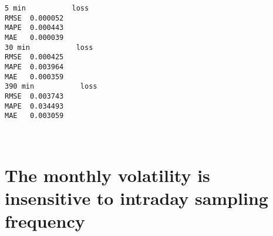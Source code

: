 \documentclass[11pt]{article}
\begin{document}
    \begin{Verbatim}[commandchars=\\\{\}]
5 min           loss
RMSE  0.000052
MAPE  0.000443
MAE   0.000039
30 min           loss
RMSE  0.000425
MAPE  0.003964
MAE   0.000359
390 min           loss
RMSE  0.003743
MAPE  0.034493
MAE   0.003059

    \end{Verbatim}

    \begin{center}
    \end{center}
    { \hspace*{\fill} \\}
    
    \section{The monthly volatility is insensitive to intraday sampling
frequency}\label{the-monthly-volatility-is-insensitive-to-intraday-sampling-frequency}
\end{document}
